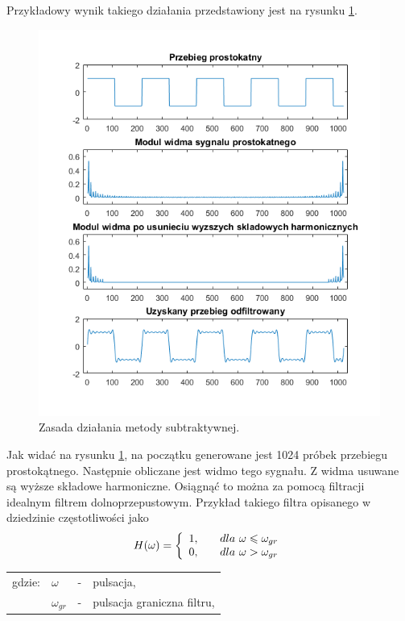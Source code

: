 Przykładowy wynik takiego działania przedstawiony jest na rysunku \ref{rys:sub_wykres1}.
\begin{figure}[H]
	\centering
	\includegraphics[width=12cm]{grafiki/sub_wykres1}
	\captionsetup{justification=centering}
	\caption{Zasada działania metody subtraktywnej.}
	\label{rys:sub_wykres1}
\end{figure}
Jak widać na rysunku \ref{rys:sub_wykres1}, na początku generowane jest 1024 próbek przebiegu prostokątnego. Następnie obliczane jest widmo tego sygnału. Z widma usuwane są wyższe składowe harmoniczne. Osiągnąć to można za pomocą filtracji idealnym filtrem dolnoprzepustowym. Przykład takiego filtra opisanego w dziedzinie częstotliwości jako
\begin{equation} \label{equ:sub_lowpass}
H(\omega)=\left \{\begin{array}{ r l }
1, & \quad \text{$dla$ } \omega \leqslant \omega_{gr}\\
0, & \quad  \text{$dla$ } \omega > \omega_{gr}
\end{array}
\right.
\end{equation}
\begin{tabular}{ l l l l}
	gdzie: & $\omega$ &  - & pulsacja, \\
	&	$\omega_{gr}$ & - &  pulsacja graniczna filtru,\\
\end{tabular} \\ \\
